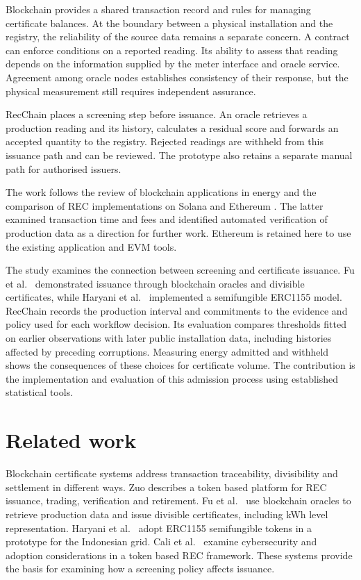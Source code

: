 \documentclass[11pt,a4paper]{article}
\begin{document}
Blockchain provides a shared transaction record and rules for managing certificate balances. At the boundary between a physical installation and the registry, the reliability of the source data remains a separate concern. A contract can enforce conditions on a reported reading. Its ability to assess that reading depends on the information supplied by the meter interface and oracle service. Agreement among oracle nodes establishes consistency of their response, but the physical measurement still requires independent assurance.

RecChain places a screening step before issuance. An oracle retrieves a production reading and its history, calculates a residual score and forwards an accepted quantity to the registry. Rejected readings are withheld from this issuance path and can be reviewed. The prototype also retains a separate manual path for authorised issuers.

The work follows the review of blockchain applications in energy \cite{review} and the comparison of REC implementations on Solana and Ethereum \cite{comparison}. The latter examined transaction time and fees and identified automated verification of production data as a direction for further work. Ethereum is retained here to use the existing application and EVM tools.

The study examines the connection between screening and certificate issuance. Fu et al.\ \cite{fu} demonstrated issuance through blockchain oracles and divisible certificates, while Haryani et al.\ \cite{haryani} implemented a semifungible ERC1155 model. RecChain records the production interval and commitments to the evidence and policy used for each workflow decision. Its evaluation compares thresholds fitted on earlier observations with later public installation data, including histories affected by preceding corruptions. Measuring energy admitted and withheld shows the consequences of these choices for certificate volume. The contribution is the implementation and evaluation of this admission process using established statistical tools.

\section{Related work}
Blockchain certificate systems address transaction traceability, divisibility and settlement in different ways. Zuo \cite{zuo} describes a token based platform for REC issuance, trading, verification and retirement. Fu et al.\ \cite{fu} use blockchain oracles to retrieve production data and issue divisible certificates, including kWh level representation. Haryani et al.\ \cite{haryani} adopt ERC1155 semifungible tokens in a prototype for the Indonesian grid. Cali et al.\ \cite{cali} examine cybersecurity and adoption considerations in a token based REC framework. These systems provide the basis for examining how a screening policy affects issuance.
\end{document}
